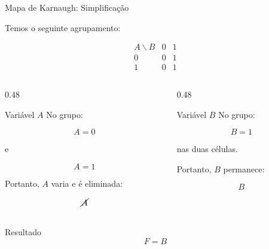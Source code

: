 \begin{frame}{Mapa de Karnaugh: Simplificação}
    \small

    Temos o seguinte agrupamento:

    \[
    \begin{array}{c|cc}
        A\backslash B & 0 & 1 \\ \hline
        0 & 0 & \boxed{1} \\
        1 & 0 & \boxed{1}
    \end{array}
    \]

    \begin{columns}[T]

        \begin{column}{0.48\textwidth}
            \begin{block}{Variável $A$}
                No grupo:

                \[
                    A=0
                \]

                e

                \[
                    A=1
                \]

                Portanto, $A$ varia e é eliminada:

                \[
                    \cancel{A}
                \]
            \end{block}
        \end{column}

        \begin{column}{0.48\textwidth}
            \begin{block}{Variável $B$}
                No grupo:

                \[
                    B=1
                \]

                nas duas células.

                Portanto, $B$ permanece:

                \[
                    \boxed{B}
                \]
            \end{block}
        \end{column}

    \end{columns}

    \begin{alertblock}{Resultado}
        \[
            \boxed{F=B}
        \]
    \end{alertblock}

\end{frame}